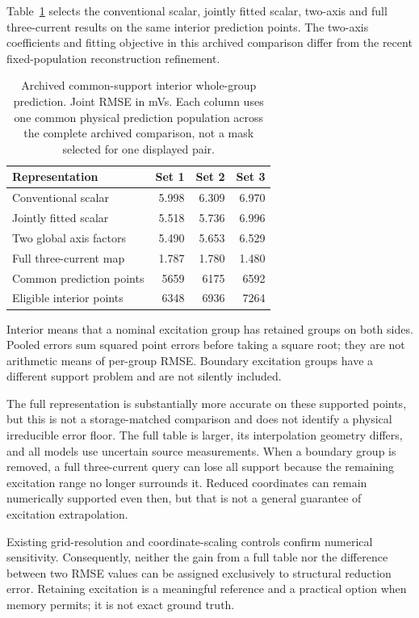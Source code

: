 Table~\ref{tab:archive-prediction} selects the conventional scalar, jointly fitted scalar, two-axis and full three-current results on the same interior prediction points. The two-axis coefficients and fitting objective in this archived comparison differ from the recent fixed-population reconstruction refinement.
\begin{table}[htbp]\centering\small
\caption{Archived common-support interior whole-group prediction. Joint RMSE in mVs. Each column uses one common physical prediction population across the complete archived comparison, not a mask selected for one displayed pair.}\label{tab:archive-prediction}
\begin{tabular}{lrrr}
\toprule
Representation & Set 1 & Set 2 & Set 3\\
\midrule
Conventional scalar & 5.998 & 6.309 & 6.970\\
Jointly fitted scalar & 5.518 & 5.736 & 6.996\\
Two global axis factors & 5.490 & 5.653 & 6.529\\
Full three-current map & 1.787 & 1.780 & 1.480\\
\midrule
Common prediction points & 5659 & 6175 & 6592\\
Eligible interior points & 6348 & 6936 & 7264\\
\bottomrule
\end{tabular}
\end{table}
Interior means that a nominal excitation group has retained groups on both sides. Pooled errors sum squared point errors before taking a square root; they are not arithmetic means of per-group RMSE. Boundary excitation groups have a different support problem and are not silently included.

The full representation is substantially more accurate on these supported points, but this is not a storage-matched comparison and does not identify a physical irreducible error floor. The full table is larger, its interpolation geometry differs, and all models use uncertain source measurements. When a boundary group is removed, a full three-current query can lose all support because the remaining excitation range no longer surrounds it. Reduced coordinates can remain numerically supported even then, but that is not a general guarantee of excitation extrapolation.

Existing grid-resolution and coordinate-scaling controls confirm numerical sensitivity. Consequently, neither the gain from a full table nor the difference between two RMSE values can be assigned exclusively to structural reduction error. Retaining excitation is a meaningful reference and a practical option when memory permits; it is not exact ground truth.

